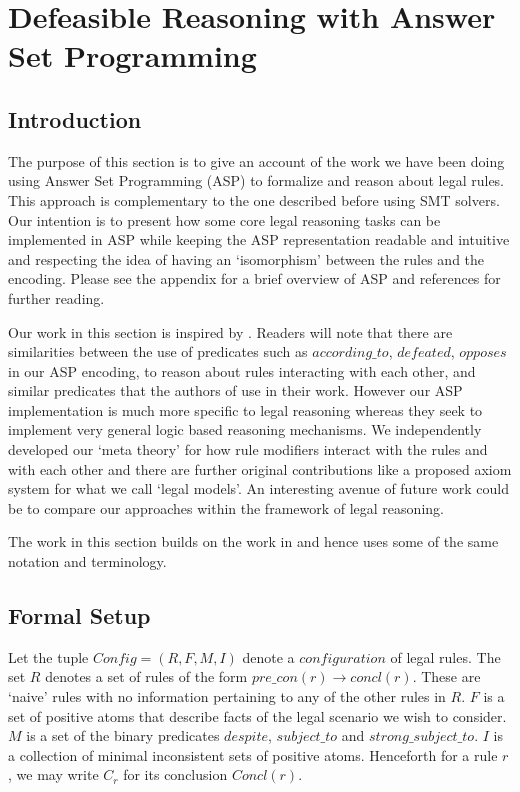\section{Defeasible Reasoning with Answer Set Programming}\label{sec:defeasible_asp}



\subsection{Introduction}
The purpose of this section is to give an account of the work we have been doing using Answer Set Programming (ASP) to formalize and reason about legal rules. This approach is complementary to the one described before using SMT solvers. Our intention is to present how some core legal reasoning tasks can be implemented in ASP while keeping the ASP representation readable and intuitive and respecting the idea of having an `isomorphism' between the rules and the encoding. Please see the appendix for a brief overview of ASP and references for further reading.

Our work in this section is inspired by \cite{DBLP:conf/iclp/WanGKFL09}. Readers will note that there are similarities between the use of predicates such as $according\_to$, $defeated$, $opposes$ in our ASP encoding, to reason about rules interacting with each other, and similar predicates that the authors of \cite{DBLP:conf/iclp/WanGKFL09} use in their work. However our ASP implementation is much more specific to legal reasoning whereas they seek to implement very general logic based reasoning mechanisms. We independently developed our `meta theory' for how rule modifiers interact with the rules and with each other and there are further original contributions like a proposed axiom system for what we call `legal models'. An interesting avenue of future work could be to compare our approaches within the framework of legal reasoning.

The work in this section builds on the work in \cite{morris21:_const_answer_set_progr_tool} and hence uses some of the same notation and terminology. 


\subsection{Formal Setup}
Let the tuple $Config = (R,F,M,I)$ denote a $configuration$ of legal rules. The set $R$ denotes a set of rules of the form $pre\_con(r)\rightarrow concl(r)$. These are `naive' rules with no information pertaining to any of the other rules in $R$. $F$ is a set of positive atoms that describe facts of the legal scenario we wish to consider. $M$ is a set of the binary predicates $despite$, $subject\_to$ and $strong\_subject\_to$. $I$ is a collection of minimal inconsistent sets of positive atoms. Henceforth for a rule $r$, we may write $C_{r}$ for its conclusion $Concl(r)$.

